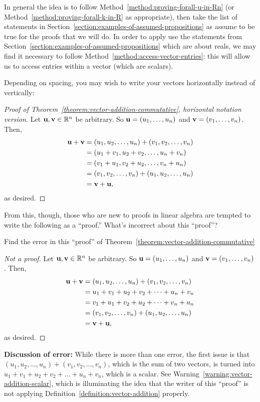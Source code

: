 \documentclass{book}
\theoremstyle{ekimcustom}
\begin{document}
In general the idea is to follow Method~\ref{method:proving-forall-u-in-Rn} (or Method~\ref{method:proving-forall-k-in-R} as appropriate), then take the list of statements in Section~\ref{section:examples-of-assumed-propositions} as assume to be true for the proofs that we will do. In order to apply use the statements from Section~\ref{section:examples-of-assumed-propositions} which are about reals, we may find it necessary to follow Method~\ref{method:access-vector-entries}: this will allow us to access entries within a vector (which are scalars).

Depending on spacing, you may wish to write your vectors horizontally instead of vertically:
\begin{proof}[Proof of Theorem~\ref{theorem:vector-addition-commutative}, horizontal notation version]
Let ${\bf u}, {\bf v} \in \mathbb{R}^n$ be arbitrary. So ${\bf u} = (u_1,\dots,u_n)$ and ${\bf v} = (v_1,\dots,v_n)$. Then,
\begin{align*}
{\bf u} + {\bf v}
&= 
(u_1,u_2,\dots,u_n)
+
(v_1,v_2,\dots,v_n)\\
&=
(u_1+v_1,u_2+v_2,\dots,u_n+v_n)\\
&=
(v_1+u_1,v_2+u_2,\dots,v_n+u_n)\\
&=
(v_1,v_2,\dots,v_n)
+
(u_1,u_2,\dots,u_n)
\\
&=
{\bf v} + {\bf u},
\end{align*}
as desired.
\end{proof}

From this, though, those who are new to proofs in linear algebra are tempted to write the following as a ``proof.'' What's incorrect about this ``proof''?
\begin{bwarning}{Find the error in this ``proof'' of Theorem~\ref{theorem:vector-addition-commutative}}{}
\begin{proof}[Not a proof]
Let ${\bf u}, {\bf v} \in \mathbb{R}^n$ be arbitrary. So ${\bf u} = (u_1,\dots,u_n)$ and ${\bf v} = (v_1,\dots,v_n)$. Then,
\begin{align*}
{\bf u} + {\bf v}
&= 
(u_1,u_2,\dots,u_n)
+
(v_1,v_2,\dots,v_n)\\
&=
u_1+v_1+u_2+v_2+\dots+u_n+v_n\\
&=
v_1+u_1+v_2+u_2+\dots+v_n+u_n\\
&=
(v_1,v_2,\dots,v_n)
+
(u_1,u_2,\dots,u_n)
\\
&=
{\bf v} + {\bf u},
\end{align*}
as desired.
\end{proof}
{\bf Discussion of error:} While there is more than one error, the first issue is that $(u_1,u_2,\dots,u_n) + (v_1,v_2,\dots,v_n)$, which is the sum of two vectors, is turned into $u_1+v_1+u_2+v_2+\dots+u_n+v_n$, which is a scalar. See Warning~\ref{warning:vector-addition-scalar}, which is illuminating the idea that the writer of this ``proof'' is not applying Definition~\ref{definition:vector-addition} properly.
\end{bwarning}
\end{document}
